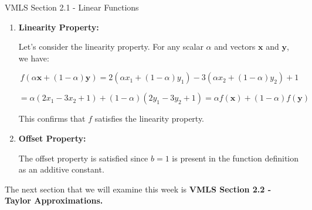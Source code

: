 \begin{notes}{VMLS Section 2.1 - Linear Functions}
\begin{highlight}
        \begin{enumerate}
            \item \textbf{Linearity Property:}
            
            Let's consider the linearity property. For any scalar \(\alpha\) and vectors \(\mathbf{x}\) and \(\mathbf{y}\), we have:
            
            \[
            f(\alpha\mathbf{x} + (1-\alpha)\mathbf{y}) = 2(\alpha x_1 + (1-\alpha)y_1) - 3(\alpha x_2 + (1-\alpha)y_2) + 1
            \]
            
            \[
            = \alpha(2x_1 - 3x_2 + 1) + (1-\alpha)(2y_1 - 3y_2 + 1) = \alpha f(\mathbf{x}) + (1-\alpha) f(\mathbf{y})
            \]
            
            This confirms that \( f \) satisfies the linearity property.
            
            \item \textbf{Offset Property:}
            
            The offset property is satisfied since \( b = 1 \) is present in the function definition as an additive constant.
        \end{enumerate}
    \end{highlight}
\end{notes}

The next section that we will examine this week is \textbf{VMLS Section 2.2 - Taylor Approximations.}

